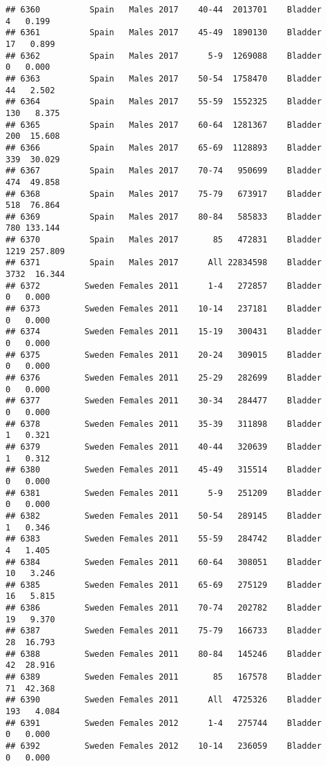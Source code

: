 \documentclass[
]{article}
\begin{document}
\begin{verbatim}
## 6360          Spain   Males 2017    40-44  2013701    Bladder      4   0.199
## 6361          Spain   Males 2017    45-49  1890130    Bladder     17   0.899
## 6362          Spain   Males 2017      5-9  1269088    Bladder      0   0.000
## 6363          Spain   Males 2017    50-54  1758470    Bladder     44   2.502
## 6364          Spain   Males 2017    55-59  1552325    Bladder    130   8.375
## 6365          Spain   Males 2017    60-64  1281367    Bladder    200  15.608
## 6366          Spain   Males 2017    65-69  1128893    Bladder    339  30.029
## 6367          Spain   Males 2017    70-74   950699    Bladder    474  49.858
## 6368          Spain   Males 2017    75-79   673917    Bladder    518  76.864
## 6369          Spain   Males 2017    80-84   585833    Bladder    780 133.144
## 6370          Spain   Males 2017       85   472831    Bladder   1219 257.809
## 6371          Spain   Males 2017      All 22834598    Bladder   3732  16.344
## 6372         Sweden Females 2011      1-4   272857    Bladder      0   0.000
## 6373         Sweden Females 2011    10-14   237181    Bladder      0   0.000
## 6374         Sweden Females 2011    15-19   300431    Bladder      0   0.000
## 6375         Sweden Females 2011    20-24   309015    Bladder      0   0.000
## 6376         Sweden Females 2011    25-29   282699    Bladder      0   0.000
## 6377         Sweden Females 2011    30-34   284477    Bladder      0   0.000
## 6378         Sweden Females 2011    35-39   311898    Bladder      1   0.321
## 6379         Sweden Females 2011    40-44   320639    Bladder      1   0.312
## 6380         Sweden Females 2011    45-49   315514    Bladder      0   0.000
## 6381         Sweden Females 2011      5-9   251209    Bladder      0   0.000
## 6382         Sweden Females 2011    50-54   289145    Bladder      1   0.346
## 6383         Sweden Females 2011    55-59   284742    Bladder      4   1.405
## 6384         Sweden Females 2011    60-64   308051    Bladder     10   3.246
## 6385         Sweden Females 2011    65-69   275129    Bladder     16   5.815
## 6386         Sweden Females 2011    70-74   202782    Bladder     19   9.370
## 6387         Sweden Females 2011    75-79   166733    Bladder     28  16.793
## 6388         Sweden Females 2011    80-84   145246    Bladder     42  28.916
## 6389         Sweden Females 2011       85   167578    Bladder     71  42.368
## 6390         Sweden Females 2011      All  4725326    Bladder    193   4.084
## 6391         Sweden Females 2012      1-4   275744    Bladder      0   0.000
## 6392         Sweden Females 2012    10-14   236059    Bladder      0   0.000

\end{verbatim}
\end{document}

